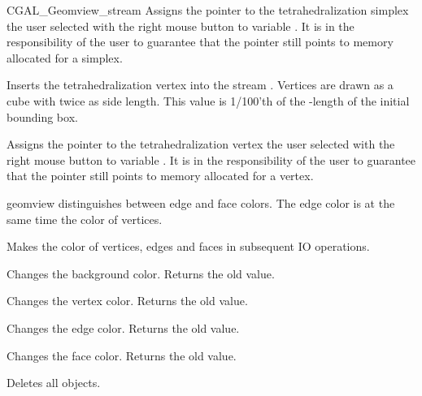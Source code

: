 \begin{ccClass}{CGAL_Geomview_stream}
{Assigns the pointer to the tetrahedralization simplex the user selected
 with the right mouse button to variable . 
\ccPrecond It is in the responsibility of the user to guarantee that the
pointer still points to memory allocated for a simplex.}


{Inserts the tetrahedralization vertex  into the stream \ccVar.
 Vertices are drawn as a cube with twice 
 as side length. This value is 1/100'th of the -length of the
initial bounding box.}


{Assigns the pointer to the tetrahedralization vertex the user selected
 with the right mouse button to variable . 
\ccPrecond It is in the responsibility of the user to guarantee that the
pointer still points to memory allocated for a vertex.}


geomview distinguishes between edge and face colors. The edge color
is at the same time the color of vertices. 

{Makes  the color of vertices, edges and faces in subsequent IO 
 operations.}

{Changes the background color. Returns the old value.}

{Changes the vertex color. Returns the old value.}

{Changes the edge color. Returns the old value.}


{Changes the face color. Returns the old value.}



{Deletes all objects.}


\end{ccClass}

